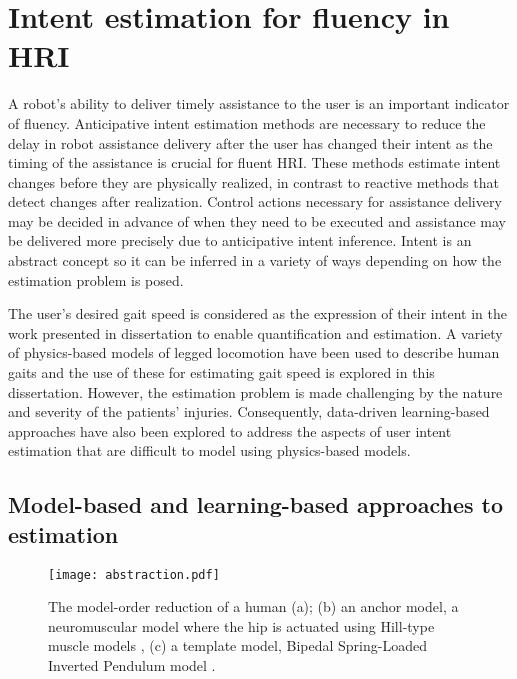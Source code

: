 \section{Intent estimation for fluency in HRI}

A robot's ability to deliver timely assistance to the user is an important indicator of fluency. Anticipative intent estimation methods are necessary to reduce the delay in robot assistance delivery after the user has changed their intent as the timing of the assistance is crucial for fluent HRI. These methods estimate intent changes before they are physically realized, in contrast to reactive methods that detect changes after realization. Control actions necessary for assistance delivery may be decided in advance of when they need to be executed and assistance may be delivered more precisely due to anticipative intent inference. Intent is an abstract concept so it can be inferred in a variety of ways depending on how the estimation problem is posed. 

The user's desired gait speed is considered as the expression of their intent in the work presented in dissertation to enable quantification and estimation. A variety of physics-based models of legged locomotion have been used to describe human gaits and the use of these for estimating gait speed is explored in this dissertation. However, the estimation problem is made challenging by the nature and severity of the patients' injuries. Consequently, data-driven learning-based approaches have also been explored to address the aspects of user intent estimation that are difficult to model using physics-based models.

\subsection{Model-based and learning-based approaches to estimation}
\begin{figure}
	\centering
	\texttt{[image: abstraction.pdf]}
	\caption[The model-order reduction of a human (a); (b) an anchor model, a neuromuscular model where the hip is actuated using Hill-type muscle models, (c) a template model, Bipedal Spring-Loaded Inverted Pendulum model]{The model-order reduction of a human (a); (b) an anchor model, a neuromuscular model where the hip is actuated using Hill-type muscle models \cite{davoodi2019template}, (c) a template model, Bipedal Spring-Loaded Inverted Pendulum model \cite{geyer2006compliant}. }\label{fig:abstraction}
\end{figure}

